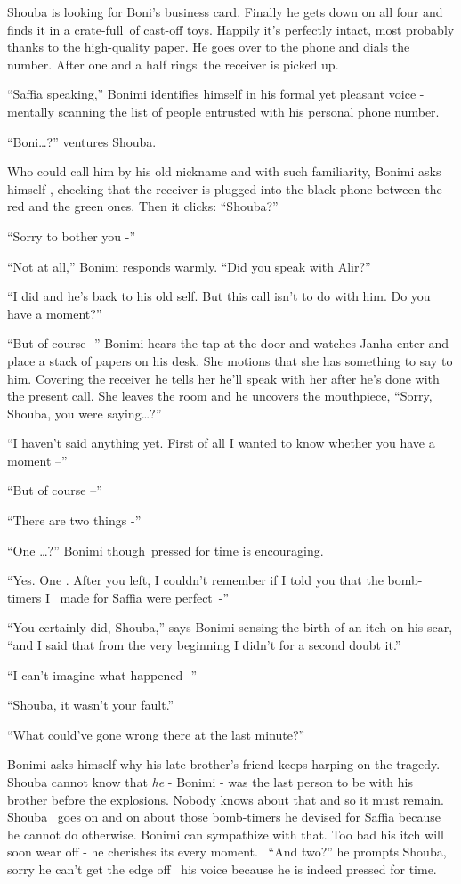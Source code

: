 \documentclass[twoside,11pt]{book}
\begin{document}
Shouba is looking for Boni's business card. Finally he gets down on all four and finds it in a crate-full~of cast-off
toys. Happily it's perfectly intact, most probably thanks to the high-quality paper. He goes over to the phone and
dials the number. After one and a half rings~the receiver is picked up.

``Saffia speaking,'' Bonimi identifies himself in his formal yet pleasant voice - mentally
scanning the list of people entrusted with his personal phone number.

``Boni{\dots}?'' ventures Shouba.

Who could call him by his old nickname and with such familiarity, Bonimi asks himself , checking that the receiver is
plugged into the black phone between the red and the green ones. Then it clicks: ``Shouba?''

``Sorry to bother you -''

``Not at all,'' Bonimi responds warmly. ``Did you speak with Alir?''

``I did and he's back to his old self. But this call isn't to do with him. Do you have a
moment?''

``But of course -'' Bonimi hears the tap at the door and watches Janha enter and place a stack
of papers on his desk. She motions that she has something to say to him. Covering the receiver he tells her he'll speak
with her after he's done with the present call. She leaves the room and he uncovers the mouthpiece,
``Sorry, Shouba, you were saying{\dots}?''

``I haven't said anything yet. First of all I wanted to know whether you have a moment --''

``But of course --''

``There are two things -''

``One {\dots}?'' Bonimi though~pressed for time is encouraging.

``Yes. One . After you left, I couldn't remember if I told you that the bomb-timers I \ made for Saffia
were perfect~-''

``You certainly did, Shouba,'' says Bonimi sensing the birth of an itch on his scar,
``and I said that from the very beginning I didn't for a second doubt it.''

``I can't imagine what happened -''

``Shouba, it wasn't your fault.''

``What could've gone wrong there at the last minute?''

Bonimi asks himself why his late brother's friend keeps harping on the tragedy. Shouba cannot know that \textit{he} -
Bonimi - was the last person to be with his brother before the explosions. Nobody knows about that and so it must
remain. Shouba~ goes on and on about those bomb-timers he devised for Saffia because he cannot do otherwise. Bonimi can
sympathize with that. Too bad his itch will soon wear off - he cherishes its every moment. ~``And
two?'' he prompts Shouba, sorry he can't get the edge off \ his voice because he is indeed pressed for
time.
\end{document}
